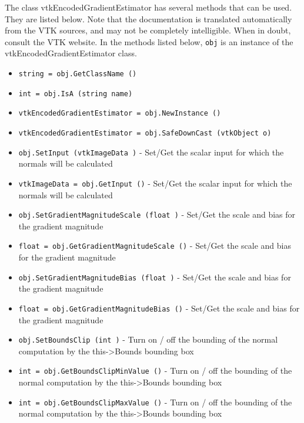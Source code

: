 The class vtkEncodedGradientEstimator has several methods that can be used.
  They are listed below.
Note that the documentation is translated automatically from the VTK sources,
and may not be completely intelligible.  When in doubt, consult the VTK website.
In the methods listed below, \verb|obj| is an instance of the vtkEncodedGradientEstimator class.
\begin{itemize}
\item  \verb|string = obj.GetClassName ()|

\item  \verb|int = obj.IsA (string name)|

\item  \verb|vtkEncodedGradientEstimator = obj.NewInstance ()|

\item  \verb|vtkEncodedGradientEstimator = obj.SafeDownCast (vtkObject o)|

\item  \verb|obj.SetInput (vtkImageData )| -  Set/Get the scalar input for which the normals will be 
 calculated

\item  \verb|vtkImageData = obj.GetInput ()| -  Set/Get the scalar input for which the normals will be 
 calculated

\item  \verb|obj.SetGradientMagnitudeScale (float )| -  Set/Get the scale and bias for the gradient magnitude

\item  \verb|float = obj.GetGradientMagnitudeScale ()| -  Set/Get the scale and bias for the gradient magnitude

\item  \verb|obj.SetGradientMagnitudeBias (float )| -  Set/Get the scale and bias for the gradient magnitude

\item  \verb|float = obj.GetGradientMagnitudeBias ()| -  Set/Get the scale and bias for the gradient magnitude

\item  \verb|obj.SetBoundsClip (int )| -  Turn on / off the bounding of the normal computation by
 the this->Bounds bounding box

\item  \verb|int = obj.GetBoundsClipMinValue ()| -  Turn on / off the bounding of the normal computation by
 the this->Bounds bounding box

\item  \verb|int = obj.GetBoundsClipMaxValue ()| -  Turn on / off the bounding of the normal computation by
 the this->Bounds bounding box


\end{itemize}
